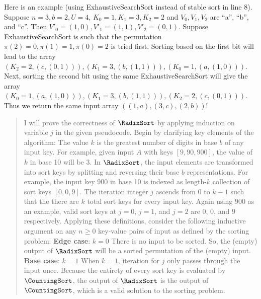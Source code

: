 \documentclass[11pt]{article}
\begin{document}
\begin{enumerate}
\begin{enumerate}
            Here is an example (using ExhaustiveSearchSort instead of stable sort in line 8). Suppose $n=3, b=2, U=4$, $K_0=1, K_1=3, K_2=2$ and $V_0, V_1, V_2$ are ``a'', ``b'', and ``c''. Then $V'_0=(1,0), V'_1=(1,1), V'_2=(0,1)$. Suppose ExhaustiveSearchSort is such that the permutation $\pi(2)=0, \pi(1)=1, \pi(0)=2$ 
 is tried first. Sorting based on the first bit will lead to the array $(K_2=2, (c,(0,1))), (K_1=3, (b,(1,1))), (K_0=1,(a,(1,0)))$. Next, sorting the second bit using the same ExhaustiveSearchSort will give the array $(K_0=1,(a,(1,0))), (K_1=3, (b,(1,1))), (K_2=2, (c,(0,1)))$. Thus we return the same input array $((1,a),(3,c),(2,b))$!
    \begin{quote}
        \color{purple}
        I will prove the correctness of $\RadixSort$ by applying induction on variable $j$ in the given pseudocode. Begin by clarifying key elements of the algorithm: \newline
        The value $k$ is the greatest number of digits in base $b$ of any input key. For example, given input $A$ with keys $[9, 90, 900]$, the value of $k$ in base 10 will be $3$. \newline 
        In $\RadixSort$, the input elements are transformed into sort keys by splitting and reversing their base $b$ representations. For example, the input key $900$ in base 10 is indexed as length-$k$ collection of sort keys $[0, 0, 9]$. \newline 
        The iteration integer $j$ ascends from $0$ to $k - 1$ such that the there are $k$ total sort keys for every input key. Again using $900$ as an example, valid sort keys at $j = 0$, $j = 1$, and $j = 2$ are $0$, $0$, and $9$ respectively. \newline
        Applying these definitions, consider the following inductive argument on any $n \geq 0$ key-value pairs of input as defined by the sorting problem: 
        \newline
        \newline 
        \textbf{Edge case}: $k = 0$ \newline
        There is no input to be sorted. So, the (empty) output of $\RadixSort$ will be a sorted permutation of the (empty) input.
        \newline 
        \newline
        \textbf{Base case}: $k = 1$ \newline
        When $k = 1$, iteration for $j$ only passes through the input once. Because the entirety of every sort key is evaluated by $\CountingSort$, the output of $\RadixSort$ is the output of $\CountingSort$, which is a valid solution to the sorting problem.

\end{quote}
\end{enumerate}
\end{enumerate}
\end{document}
